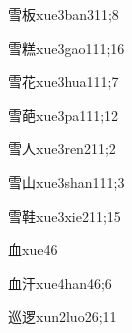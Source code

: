 \begin{verbete}{雪板}{xue3ban3}{11;8}
\end{verbete}

\begin{verbete}{雪糕}{xue3gao1}{11;16}
\end{verbete}

\begin{verbete}{雪花}{xue3hua1}{11;7}
\end{verbete}

\begin{verbete}{雪葩}{xue3pa1}{11;12}
\end{verbete}

\begin{verbete}{雪人}{xue3ren2}{11;2}
\end{verbete}

\begin{verbete}{雪山}{xue3shan1}{11;3}
\end{verbete}

\begin{verbete}{雪鞋}{xue3xie2}{11;15}
\end{verbete}

\begin{verbete}{血}{xue4}{6}
\end{verbete}

\begin{verbete}{血汗}{xue4han4}{6;6}
\end{verbete}

\begin{verbete}{巡逻}{xun2luo2}{6;11}
\end{verbete}

